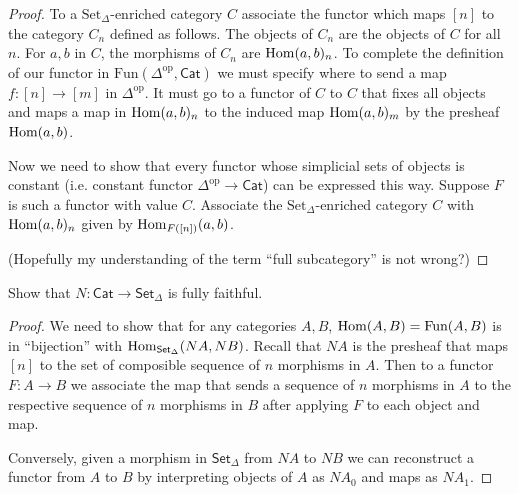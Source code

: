 \begin{proof}
To a $\text{Set}_\Delta$-enriched category $C$ 
associate the functor which maps $[n]$ 
to the category $C_n$ defined as follows.
The objects of $C_n$ are the objects of $C$ for all $n$.
For $a,b$ in $C$, the morphisms of $C_n$ 
are $\mathop{\mathrm{Hom}}\nolimits(a,b)_n$. To complete the definition of our
functor in $\text{Fun}(\Delta^{\text{op}},\mathsf{Cat})$ 
we must specify where to send a map $f:[n] \to [m]$ in $\Delta^{\text{op}}$.
It must go to a functor of $C$ to $C$ that fixes
all objects and maps a map in $\mathop{\mathrm{Hom}}\nolimits(a,b)_n$ 
to the induced map $\mathop{\mathrm{Hom}}\nolimits(a,b)_m$ by the presheaf
$\mathop{\mathrm{Hom}}\nolimits(a,b)$.

Now we need to show that every functor whose simplicial sets
of objects is constant 
(i.e. constant functor $\Delta^{\text{op}}\to\mathsf{Cat}$)
can be expressed this way. Suppose $F$ is such a functor
with value $C$. Associate the $\text{Set}_\Delta$-enriched
category $C$ with $\mathop{\mathrm{Hom}}\nolimits(a,b)_n$ given by
$\mathop{\mathrm{Hom}}\nolimits_{F([n])}(a,b)$.

(Hopefully my understanding of the term ``full subcategory'' is
not wrong?)
\end{proof}

\begin{exercise}[1.3]
\label{exercise-N-is-fully-faithful}
Show that $N:\mathsf{Cat}\to\mathsf{Set}_\Delta$ is fully faithful.
\end{exercise}

\begin{proof}
We need to show that for any categories $A,B$,
$\mathop{\mathrm{Hom}}\nolimits(A,B)=\text{Fun}(A,B)$ is in ``bijection'' with
$\mathop{\mathrm{Hom}}\nolimits_{\mathsf{Set}_\Delta}(NA,NB)$.
Recall that
$NA$ is the presheaf that maps $[n]$ to
the set of composible sequence of $n$ morphisms in $A$.
Then to a functor $F:A \to B$ we associate the
map that sends a sequence of $n$ morphisms in $A$ 
to the respective sequence of $n$ morphisms in $B$ 
after applying $F$ to each object and map.

Conversely, given a morphism in $\mathsf{Set}_\Delta$
from $NA$ to $NB$
we can reconstruct a functor from $A$ to $B$
 by interpreting objects of $A$ as $NA_0$ and 
maps as $NA_1$.
\end{proof}






